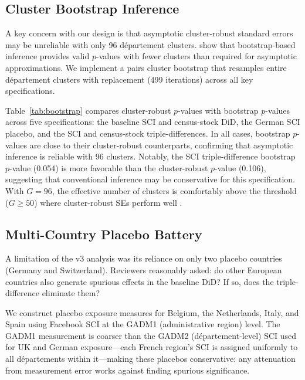 \documentclass[12pt]{article}
\begin{document}
\subsection{Cluster Bootstrap Inference}

A key concern with our design is that asymptotic cluster-robust standard errors may be unreliable with only 96 d\'epartement clusters. \citet{cameron2008bootstrap} show that bootstrap-based inference provides valid $p$-values with fewer clusters than required for asymptotic approximations. We implement a pairs cluster bootstrap that resamples entire d\'epartement clusters with replacement (499 iterations) across all key specifications.

Table~\ref{tab:bootstrap} compares cluster-robust $p$-values with bootstrap $p$-values across five specifications: the baseline SCI and census-stock DiD, the German SCI placebo, and the SCI and census-stock triple-differences. In all cases, bootstrap $p$-values are close to their cluster-robust counterparts, confirming that asymptotic inference is reliable with 96 clusters. Notably, the SCI triple-difference bootstrap $p$-value (0.054) is more favorable than the cluster-robust $p$-value (0.106), suggesting that conventional inference may be conservative for this specification. With $G = 96$, the effective number of clusters is comfortably above the threshold ($G \geq 50$) where cluster-robust SEs perform well \citep{mackinnon2023cluster}.

{\footnotesize}

\subsection{Multi-Country Placebo Battery}

A limitation of the v3 analysis was its reliance on only two placebo countries (Germany and Switzerland). Reviewers reasonably asked: do other European countries also generate spurious effects in the baseline DiD? If so, does the triple-difference eliminate them?

We construct placebo exposure measures for Belgium, the Netherlands, Italy, and Spain using Facebook SCI at the GADM1 (administrative region) level. The GADM1 measurement is coarser than the GADM2 (d\'epartement-level) SCI used for UK and German exposure---each French region's SCI is assigned uniformly to all d\'epartements within it---making these placebos conservative: any attenuation from measurement error works against finding spurious significance.
\end{document}
